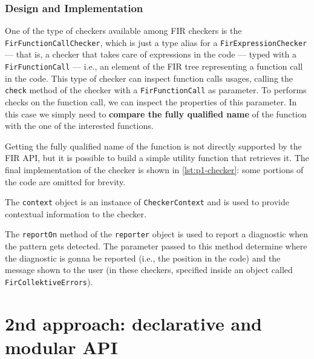 \documentclass[12pt,a4paper,openright,twoside]{book}
\begin{document}


\subsubsection{Design and Implementation}

One of the type of checkers available among \ac{FIR} checkers is the
\lstinline{FirFunctionCallChecker}, which is just a type alias for a
\lstinline{FirExpressionChecker} --- that is, a checker that takes care of
expressions in the code --- typed with a \lstinline{FirFunctionCall} --- i.e.,
an element of the \ac{FIR} tree representing a function call in the code. This
type of checker can inspect function calls usages, calling the \lstinline{check}
method of the checker with a \lstinline{FirFunctionCall} as parameter. 
%
To performs checks on the function call, we can inspect the properties of this
parameter. In this case we simply need to \textbf{compare the fully qualified
name} of the function with the one of the interested functions.

Getting the fully qualified name of the function is not directly supported by
the \ac{FIR} API, but it is possible to build a simple utility function that
retrieves it. The final implementation of the checker is shown in
\cref{lst:p1-checker}: some portions of the code are omitted for brevity.



The \lstinline{context} object is an instance of \lstinline{CheckerContext} and is 
used to provide contextual information to the checker.

The \lstinline{reportOn} method of the \lstinline{reporter} object is used to
report a diagnostic when the pattern gets detected. The parameter passed to this
method determine where the diagnostic is gonna be reported (i.e., the position
in the code) and the message shown to the user (in these checkers, specified
inside an object called \lstinline{FirCollektiveErrors}).

\section{2nd approach: declarative and modular API}
\end{document}
